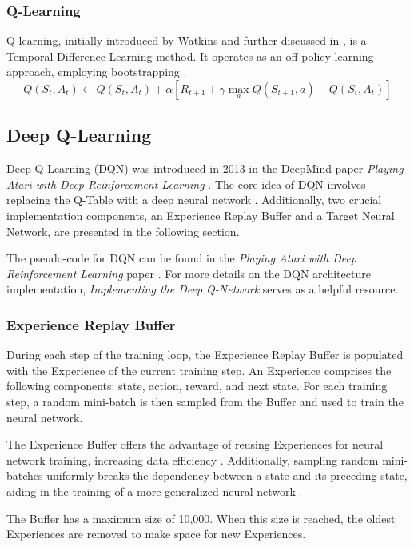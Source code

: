 \documentclass[conference]{IEEEtran}
\begin{document}
\subsubsection{Q-Learning}
Q-learning, initially introduced by Watkins \cite{b5} and further discussed in \cite{b4}, is a Temporal Difference Learning method. It operates as an off-policy learning approach, employing bootstrapping \cite{b4}.
\begin{equation*}
	Q(S_t, A_t) \leftarrow Q(S_t, A_t) + \alpha [R_{t+1} + \gamma \max_a Q(S_{t+1}, a) - Q(S_t, A_t)] \tag{3}
\end{equation*}


\subsection{Deep Q-Learning}
Deep Q-Learning (DQN) was introduced in 2013 in the DeepMind paper \textit{Playing Atari with Deep Reinforcement Learning} \cite{b2}. The core idea of DQN involves replacing the Q-Table with a deep neural network \cite{b2}. Additionally, two crucial implementation components, an Experience Replay Buffer and a Target Neural Network, are presented in the following section.

The pseudo-code for DQN can be found in the \textit{Playing Atari with Deep Reinforcement Learning} paper \cite{b2}. For more details on the DQN architecture implementation, \textit{Implementing the Deep Q-Network} \cite{b6} serves as a helpful resource.


\subsubsection{Experience Replay Buffer} \label{replay-buffer}
During each step of the training loop, the Experience Replay Buffer is populated with the Experience of the current training step. An Experience comprises the following components: state, action, reward, and next state. For each training step, a random mini-batch is then sampled from the Buffer and used to train the neural network.

The Experience Buffer offers the advantage of reusing Experiences for neural network training, increasing data efficiency \cite{b2}. Additionally, sampling random mini-batches uniformly breaks the dependency between a state and its preceding state, aiding in the training of a more generalized neural network \cite{b2}.

The Buffer has a maximum size of 10,000. When this size is reached, the oldest Experiences are removed to make space for new Experiences.
\end{document}

